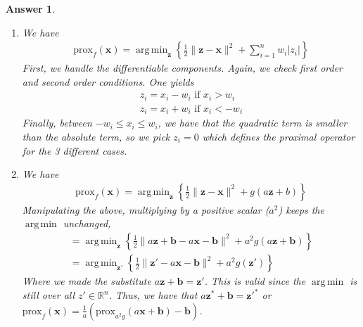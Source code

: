 \documentclass[12pt]{article}
\DeclareMathOperator*{\argmin}{arg\,min}
\theoremstyle{colon}
\newtheorem*{answer}{Answer}
\begin{document}
\begin{answer}
	\

	\begin{enumerate}[label=\alph*)]
		\item We have
			\begin{gather*}
				\text{prox}_f(\bm{x}) = \argmin_{\bm{z}} \left\{ \frac{1}{2} \lVert \bm{z} - \bm{x} \rVert^2 + \sum_{i=1}^n w_i \lvert z_i \rvert \right\}
			\end{gather*}
			First, we handle the differentiable components. Again, we check first order and second order conditions. One yields
			\begin{gather*}
				z_i = x_i - w_i \text{ if } x_i > w_i \\
				z_i = x_i + w_i \text{ if } x_i < - w_i
			\end{gather*}
			Finally, between $-w_i \leq x_i \leq w_i$, we have that the quadratic term is smaller than the absolute term, so we pick $z_i = 0$ which defines the proximal operator for the 3 different cases.

		\item We have
			\begin{gather*}
				\text{prox}_f(\bm{x}) = \argmin_{\bm{z}} \left\{ \frac{1}{2} \lVert \bm{z} - \bm{x} \rVert^2 + g(a \bm{z} + b) \right\}
			\end{gather*}
			Manipulating the above, multiplying by a positive scalar ($a^2$) keeps the $\argmin$ unchanged,
			\begin{gather*}
				= \argmin_{\bm{z}} \left\{ \frac{1}{2} \lVert a \bm{z} + \bm{b} - a\bm{x} - \bm{b} \rVert^2 + a^2 g(a \bm{z} + \bm{b}) \right\} \\
				= \argmin_{\bm{z}'} \left\{ \frac{1}{2} \lVert \bm{z}' - a\bm{x} - \bm{b} \rVert^2 + a^2 g(\bm{z}') \right\}
			\end{gather*}
			Where we made the substitute $a \bm{z} + \bm{b} = \bm{z}'$. This is valid since the $\argmin$ is still over all $z' \in \mathbb{R}^n$. Thus, we have that $a \bm{z}^* + \bm{b} = \bm{z}'^*$ or $\text{prox}_f(\bm{x}) = \frac{1}{a} ( \text{prox}_{a^2 g} (a \bm{x} + \bm{b}) - \bm{b})$.


\end{enumerate}
\end{answer}
\end{document}
